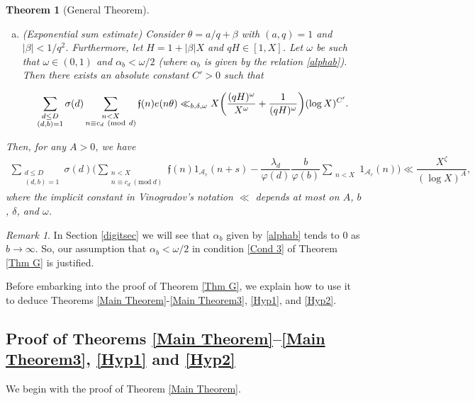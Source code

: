 \documentclass[12pt]{amsart}
\numberwithin{equation}{section}
\newtheorem{thm}{Theorem}
\theoremstyle{remark}
\newtheorem*{remark}{Remark}
\theoremstyle{definition}
\newcommand{\imod}[1]{\ (\mathrm{mod}\ #1)}
\begin{document}
\begin{thm}[General Theorem]
\begin{enumerate}[(a)]
\item \label{Cond 3} (Exponential sum estimate)
Consider $\theta =a/q+\beta$ with $(a, q)=1$ and $|\beta|<1/q^2$. Furthermore, let $H=1+|\beta|X$ and $qH\in [1, X]$. Let $\omega$ be such that $\omega \in (0, 1)$ and $\alpha_b < \omega/2$ (where $\alpha_b$ is given by the relation \eqref{alphab}). Then there exists an absolute constant $C'>0$ such that

\begin{align}
\notag \sum_{\substack{d\leq D\\(d, b)=1}}{\sigma}(d)\sum_{\substack{n< X\\n\equiv c_d \imod d}}\mathfrak{f}(n)e(n\theta) \ll_{b, \delta, \omega
} X\bigg(\dfrac{(qH)^\omega}{X^\omega} + \dfrac{1}{(qH)^\omega}\bigg)(\log X)^{C'}.
\end{align}
\end{enumerate}
Then, for any $A>0$, we have
\begin{align}
\label{genthmeq1} \sum_{\substack{d\leq D\\(d, b)=1}}{\sigma}(d)\bigg(\sum_{\substack{n < X\\n\equiv c_d \imod d}}\mathfrak{f}(n)1_{\mathcal{A}_r}(n+s) - \dfrac{\lambda_{d}}{\varphi(d)}\dfrac{b}{\varphi(b)}\sum_{\substack{n<X}}1_{\mathcal{A}_r}(n)\bigg) \ll\dfrac{X^{\zeta}}{(\log X)^A},
\end{align}
where the implicit constant in Vinogradov's notation $\ll$ depends at most on $A$, $b$, $\delta$, and $\omega$.
\end{thm}

\begin{remark}
In Section \ref{digitsec} we will see that $\alpha_b$ given by \eqref{alphab} tends to $0$ as $b\rightarrow \infty$. So, our assumption that $\alpha_b<  \omega/2$ in condition \ref{Cond 3} of Theorem \ref{Thm G} is justified.
\end{remark}

Before embarking into the proof of Theorem \ref{Thm G}, we explain how to use it to deduce Theorems \ref{Main Theorem}-\ref{Main Theorem3}, \ref{Hyp1}, and \ref{Hyp2}.






\subsection{Proof of Theorems \ref{Main Theorem}--\ref{Main Theorem3}, \ref{Hyp1} and \ref{Hyp2}}

We begin with the proof of Theorem \ref{Main Theorem}.
\end{document}
